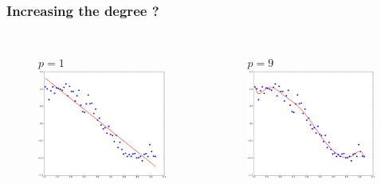 \documentclass[handout, 10pt]{beamer}
\begin{document}
\begin{frame}
\frametitle{Increasing the degree ?}
\begin{columns}
\vspace{-2em}
\begin{figure}
$p=1$
\includegraphics[width=0.99\textwidth]{./linreg_pow1.png}
\end{figure}
\vspace{-2em}
\begin{figure}
$p=9$
\includegraphics[width=0.99\textwidth]{./linreg_pow9.png}

\end{figure}
\end{columns}
\end{frame}
\end{document}
